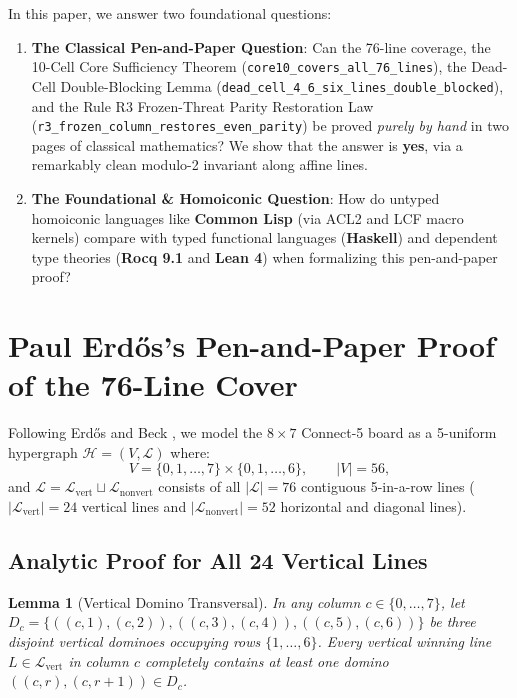 \documentclass[11pt,reqno]{amsart}
\theoremstyle{plain}
\newtheorem{lemma}[theorem]{Lemma}
\theoremstyle{definition}
\theoremstyle{remark}
\begin{document}
In this paper, we answer two foundational questions:
\begin{enumerate}
    \item \textbf{The Classical Pen-and-Paper Question}: Can the 76-line coverage, the 10-Cell Core Sufficiency Theorem (\texttt{core10\_covers\_all\_76\_lines}), the Dead-Cell Double-Blocking Lemma (\texttt{dead\_cell\_4\_6\_six\_lines\_double\_blocked}), and the Rule R3 Frozen-Threat Parity Restoration Law (\texttt{r3\_frozen\_column\_restores\_even\_parity}) be proved \emph{purely by hand} in two pages of classical mathematics? We show that the answer is \textbf{yes}, via a remarkably clean modulo-2 invariant along affine lines.
    \item \textbf{The Foundational \& Homoiconic Question}: How do untyped homoiconic languages like \textbf{Common Lisp} (via ACL2 and LCF macro kernels) compare with typed functional languages (\textbf{Haskell}) and dependent type theories (\textbf{Rocq 9.1} and \textbf{Lean 4}) when formalizing this pen-and-paper proof?
\end{enumerate}

\section{Paul Erd\H{o}s's Pen-and-Paper Proof of the 76-Line Cover}

Following Erd\H{o}s and Beck \cite{beck2008combinatorial}, we model the $8 \times 7$ Connect-5 board as a 5-uniform hypergraph $\mathcal{H} = (V, \mathcal{L})$ where:
\begin{equation}
V = \{0, 1, \dots, 7\} \times \{0, 1, \dots, 6\}, \qquad |V| = 56,
\end{equation}
and $\mathcal{L} = \mathcal{L}_{\text{vert}} \sqcup \mathcal{L}_{\text{nonvert}}$ consists of all $|\mathcal{L}| = 76$ contiguous 5-in-a-row lines ($|\mathcal{L}_{\text{vert}}| = 24$ vertical lines and $|\mathcal{L}_{\text{nonvert}}| = 52$ horizontal and diagonal lines).

\subsection{Analytic Proof for All 24 Vertical Lines}

\begin{lemma}[Vertical Domino Transversal]
\label{lem:vertical_hand}
In any column $c \in \{0,\dots,7\}$, let $D_c = \{((c,1),(c,2)), ((c,3),(c,4)), ((c,5),(c,6))\}$ be three disjoint vertical dominoes occupying rows $\{1,\dots,6\}$. Every vertical winning line $L \in \mathcal{L}_{\text{vert}}$ in column $c$ completely contains at least one domino $((c,r), (c,r+1)) \in D_c$.
\end{lemma}
\end{document}
